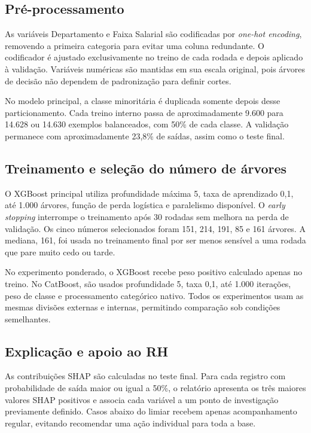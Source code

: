\documentclass[12pt]{article}
\begin{document}
\subsection{Pré-processamento}

As variáveis Departamento e Faixa Salarial são codificadas por \textit{one-hot encoding}, removendo a primeira categoria para evitar uma coluna redundante. O codificador é ajustado exclusivamente no treino de cada rodada e depois aplicado à validação. Variáveis numéricas são mantidas em sua escala original, pois árvores de decisão não dependem de padronização para definir cortes.

No modelo principal, a classe minoritária é duplicada somente depois desse particionamento. Cada treino interno passa de aproximadamente 9.600 para 14.628 ou 14.630 exemplos balanceados, com 50\% de cada classe. A validação permanece com aproximadamente 23,8\% de saídas, assim como o teste final.

\subsection{Treinamento e seleção do número de árvores}

O XGBoost principal utiliza profundidade máxima 5, taxa de aprendizado 0,1, até 1.000 árvores, função de perda logística e paralelismo disponível. O \textit{early stopping} interrompe o treinamento após 30 rodadas sem melhora na perda de validação. Os cinco números selecionados foram 151, 214, 191, 85 e 161 árvores. A mediana, 161, foi usada no treinamento final por ser menos sensível a uma rodada que pare muito cedo ou tarde.

No experimento ponderado, o XGBoost recebe peso positivo calculado apenas no treino. No CatBoost, são usados profundidade 5, taxa 0,1, até 1.000 iterações, peso de classe e processamento categórico nativo. Todos os experimentos usam as mesmas divisões externas e internas, permitindo comparação sob condições semelhantes.

\subsection{Explicação e apoio ao RH}

As contribuições SHAP são calculadas no teste final. Para cada registro com probabilidade de saída maior ou igual a 50\%, o relatório apresenta os três maiores valores SHAP positivos e associa cada variável a um ponto de investigação previamente definido. Casos abaixo do limiar recebem apenas acompanhamento regular, evitando recomendar uma ação individual para toda a base.
\end{document}
